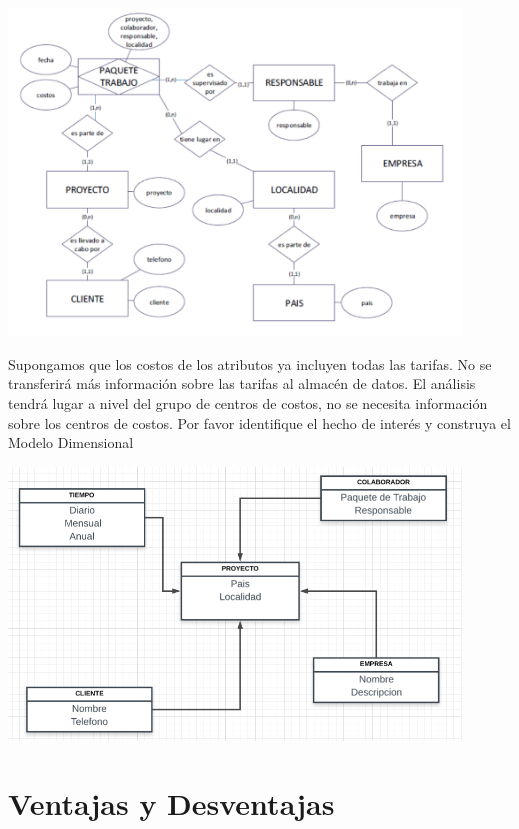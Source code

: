 \documentclass[preprint,12pt]{elsarticle}
\begin{document}
\begin{itemize}
\begin{center}
	\includegraphics[width=12cm]{./Imagenes/MODELO_ER_3} 
\end{center}

Supongamos que los costos de los atributos ya incluyen todas las tarifas. No se transferirá más información sobre las tarifas
al almacén de datos. El análisis tendrá lugar a nivel del grupo de centros de costos, no se necesita información sobre los
centros de costos.
Por favor identifique el hecho de interés y construya el Modelo Dimensional 


\begin{center}
	\includegraphics[width=12cm]{./Imagenes/MODELO_D_3} 
\end{center}

   
\end{itemize}


\section{Ventajas y Desventajas}
\end{document}

